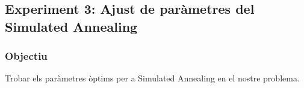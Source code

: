 
\subsection{Experiment 3: Ajust de paràmetres del Simulated Annealing}

\subsubsection{Objectiu}
Trobar els paràmetres òptims per a Simulated Annealing en el nostre problema.








